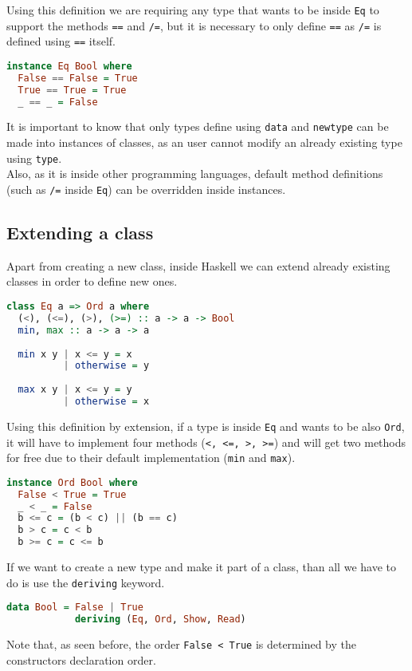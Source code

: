 Using this definition we are requiring any type that wants to be inside \texttt{Eq} to support the methods \texttt{==} and \texttt{/=}, but it is necessary to only define \texttt{==} as \texttt{/=} is defined using \texttt{==} itself. \\

\begin{lstlisting}[language=haskell]
instance Eq Bool where
  False == False = True
  True == True = True
  _ == _ = False
\end{lstlisting}

It is important to know that only types define using \texttt{data} and \texttt{newtype} can be made into instances of classes, as an user cannot modify an already existing type using \texttt{type}. \\
Also, as it is inside other programming languages, default method definitions (such as \texttt{/=} inside \texttt{Eq}) can be overridden inside instances.


\subsection{Extending a class}
Apart from creating a new class, inside Haskell we can extend already existing classes in order to define new ones. 

\begin{lstlisting}[language=haskell]
class Eq a => Ord a where
  (<), (<=), (>), (>=) :: a -> a -> Bool
  min, max :: a -> a -> a
  
  min x y | x <= y = x
  		  | otherwise = y
  		  
  max x y | x <= y = y
  		  | otherwise = x
\end{lstlisting}

Using this definition by extension, if a type is inside \texttt{Eq} and wants to be also \texttt{Ord}, it will have to implement four methods (\texttt{<, <=, >, >=}) and will get two methods for free due to their default implementation (\texttt{min} and \texttt{max}). 

\begin{lstlisting}[language=haskell]
instance Ord Bool where
  False < True = True
  _ < _ = False
  b <= c = (b < c) || (b == c)
  b > c = c < b
  b >= c = c <= b
\end{lstlisting}

If we want to create a new type and make it part of a class, than all we have to do is use the \texttt{deriving} keyword. 

\begin{lstlisting}[language=haskell]
data Bool = False | True
		    deriving (Eq, Ord, Show, Read)
\end{lstlisting}

Note that, as seen before, the order \texttt{False < True} is determined by the constructors declaration order.
